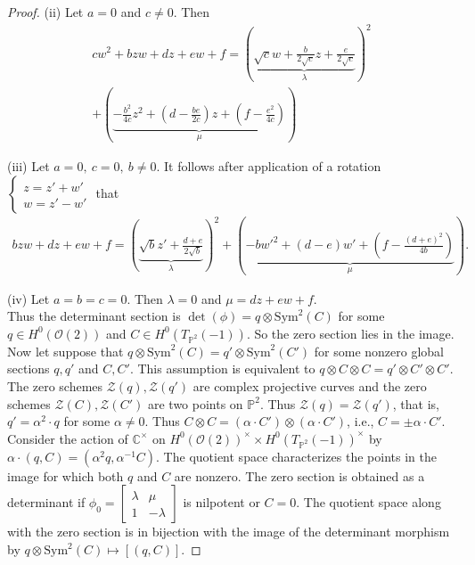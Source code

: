 \documentclass[12pt]{amsart}
\theoremstyle{definition}
\theoremstyle{remark}
\numberwithin{equation}{section}
\begin{document}
\begin{proof}
(ii) Let $a = 0$ and $c\neq 0$. Then 
\begin{align*}
cw^2 + bzw + dz + ew + f = \left(\underbrace{\sqrt{c}w  + \frac{b}{2\sqrt{c}}z + \frac{e}{2\sqrt{c}}}_{\lambda}\right)^2\\
+ \left(\underbrace{-\frac{b^2}{4c}z^2 + \left(d - \frac{be}{2c}\right)z + \left(f - \frac{e^2}{4c}\right)}_{\mu}\right)
\end{align*}

(iii) Let $a = 0,~ c = 0,~ b\neq 0$. It follows after application of a rotation $\begin{cases}
z = z' + w'\\
w = z' - w'
\end{cases}$ that \begin{align*}
bzw + dz + ew + f = \left(\underbrace{\sqrt{b}z' + \frac{d+e}{2\sqrt{b}}}_{\lambda}\right)^2 + \left(\underbrace{-bw'^2 + (d-e)w' + \left(f - \frac{(d+e)^2}{4b}\right)}_{\mu}\right).
\end{align*}

(iv) Let $a = b = c = 0$. Then $\lambda = 0$ and $\mu = dz + ew + f$.\\

Thus the determinant section is $\det(\phi) = q\otimes\mbox{Sym}^2(C)$ for some $q\in H^0(\mathcal{O}(2))$ and $C\in H^0(T_{\mathbb{P}^2}(-1))$. So the zero section lies in the image. Now let suppose that $q\otimes\mbox{Sym}^2(C) = q'\otimes\mbox{Sym}^2(C')$ for some nonzero global sections $q, q'$ and $C, C'$. This assumption is equivalent to $q\otimes C\otimes C = q'\otimes C'\otimes C'$. The zero schemes $\mathcal{Z}(q), \mathcal{Z}(q')$ are complex projective curves and the zero schemes $\mathcal{Z}(C), \mathcal{Z}(C')$ are two points on $\mathbb{P}^2$. Thus $\mathcal{Z}(q) = \mathcal{Z}(q')$, that is, $q' = \alpha^2\cdot q$ for some $\alpha\neq 0$. Thus $C\otimes C = (\alpha\cdot C')\otimes (\alpha\cdot C')$, i.e., $C = \pm\alpha\cdot C'$. Consider the action of $\mathbb{C}^\times$ on $H^0(\mathcal{O}(2))^\times\times H^0(T_{\mathbb{P}^2}(-1))^\times$ by $\alpha\cdot (q, C) = (\alpha^2q, \alpha^{-1}C)$. The quotient space characterizes the points in the image for which both $q$ and $C$ are nonzero. The zero section is obtained as a determinant if $\phi_0 = \begin{bmatrix}
    \lambda & \mu\\
    1 & -\lambda
\end{bmatrix}$ is nilpotent or $C = 0$. The quotient space along with the zero section is in bijection with the image of the determinant morphism by $q\otimes\mbox{Sym}^2(C)\mapsto [(q, C)]$. 
\end{proof}
\end{document}
